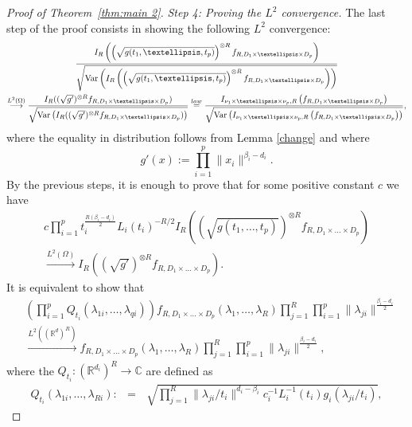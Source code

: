 \documentclass[12pt]{article}
\DeclareMathOperator{\var}{Var}
\DeclareMathOperator{\1}{1}
\newcommand{\R}{\mathbb{R}}
\theoremstyle{plain}
\theoremstyle{definition}
\begin{document}
\begin{proof}[Proof of Theorem~\ref{thm:main 2}]
     \bigskip
 
 {\it Step 4: Proving the $L^2$ convergence.} 
 The last step of the proof  consists in showing the following $L^2$ convergence: 
     \begin{multline}
\frac{I_{R}\left(\left(\sqrt{g(t_1,\dots,t_p)}\right)^{\otimes R}f_{R,D_1\times \dots\times D_p}\right)}{\sqrt{\var\left(I_{R}\left(\left(\sqrt{g(t_1,\dots,t_p)}\right)^{\otimes R}f_{R,D_1\times \dots\times D_p}\right)\right)}} \\
 \overset{L^2(\Omega)}{\longrightarrow} \frac{I_{R}((\sqrt{g'})^{\otimes R}f_{R,D_1\times \dots\times D_p})}{\sqrt{\var\left(I_{R}((\sqrt{g'})^{\otimes R}f_{R,D_1\times \dots\times D_p})\right)}} 
 \overset{\rm law}{=} \frac{I_{\nu_1\times\dots\times \nu_p,R}\left(f_{R,D_1\times \dots\times D_p}\right)}{\sqrt{\var\left(I_{\nu_1\times\dots\times \nu_p,R}\left(f_{R,D_1\times \dots\times D_p}\right)\right)}} \label{L2conv},
\end{multline}
where the equality in distribution follows from Lemma \ref{change} and where \begin{equation}
g'(x):=\prod_{i=1}^p\|x_i\|^{\beta_i-d_i}.
\end{equation} 
By the previous steps, it is enough to prove that for some positive constant $c$ we have
 \begin{multline}
       c\prod_{i=1}^p t_i^{\frac{R(\beta_i-d_i)}{2}}L_i(t_i)^{-R/2} I_{R}\left(\left(\sqrt{g(t_1,\dots,t_p)}\right)^{\otimes R}f_{R,D_1\times \dots\times D_p}\right) \\ \overset{L^2(\Omega)}{\rightarrow} I_{R}\left((\sqrt{g'})^{\otimes R}f_{R,D_1\times \dots\times D_p}\right).
 \end{multline}
It is equivalent to show that
 \begin{align}
     \label{final}
       &\left(\prod_{i=1}^p Q_{t_i}(\lambda_{1i},\dots,\lambda_{qi})\right)f_{R,D_1\times \dots\times D_p}(\lambda_1,\dots,\lambda_R)\prod_{j=1}^R\prod_{i=1}^p\|\lambda_{ji}\|^{\frac{\beta_i-d_i}{2}}\\
       &\overset{L^2((\R^d)^R)}{\longrightarrow} {f_{R,D_1\times\dots\times D_p}(\lambda_1,\dots,\lambda_R)}\prod_{j=1}^R\prod_{i=1}^p\|\lambda_{ji}\|^{\frac{\beta_i-d_i}{2}},
 \end{align}
where the $Q_{t_i}: (\R^{d_i})^R \to \mathbb C $ are defined as
 \begin{eqnarray*}
      Q_{t_i}(\lambda_{1i},\dots,\lambda_{Ri}):&=& \, \sqrt{\prod_{j=1}^R\|\lambda_{ji}/t_i\|^{d_i-\beta_i}c_i^{-1}L_i^{-1}(t_i)g_i(\lambda_{ji}/t_i)},

\end{eqnarray*}
\end{proof}
\end{document}
